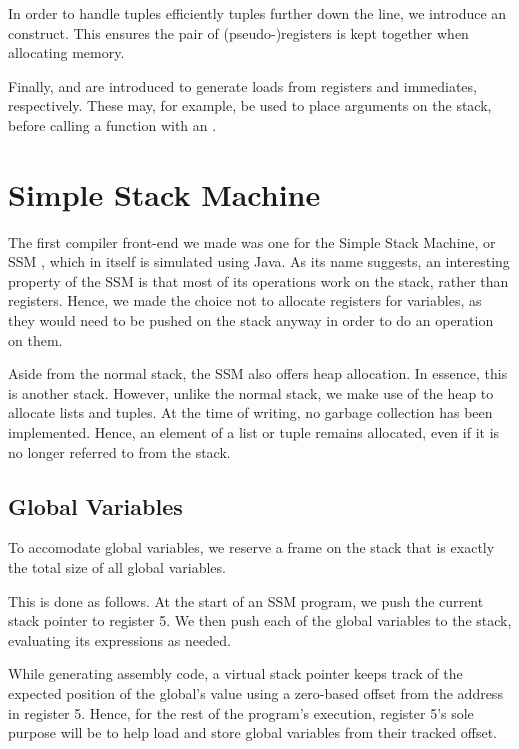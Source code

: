 In order to handle tuples efficiently tuples further down the line, we introduce an  construct.
This ensures the pair of (pseudo-)registers is kept together when allocating memory.

Finally,  and  are introduced to generate loads from registers and immediates, respectively.
These may, for example, be used to place arguments on the stack, before calling a function with an .


\section{Simple Stack Machine}

The first compiler front-end we made was one for the Simple Stack Machine, or SSM \cite{SSM}, which in itself is simulated using Java.
As its name suggests, an interesting property of the SSM is that most of its operations work on the stack, rather than registers.
Hence, we made the choice not to allocate registers for variables, as they would need to be pushed on the stack anyway in order to do an operation on them.

Aside from the normal stack, the SSM also offers heap allocation.
In essence, this is another stack.
However, unlike the normal stack, we make use of the heap to allocate lists and tuples.
At the time of writing, no garbage collection has been implemented.
Hence, an element of a list or tuple remains allocated, even if it is no longer referred to from the stack.


\subsection{Global Variables}

To accomodate global variables, we reserve a frame on the stack that is exactly the total size of all global variables.

This is done as follows.
At the start of an SSM program, we push the current stack pointer to register 5.
We then push each of the global variables to the stack, evaluating its expressions as needed.

While generating assembly code, a virtual stack pointer keeps track of the expected position of the global's value using a zero-based offset from the address in register 5.
Hence, for the rest of the program's execution, register 5's sole purpose will be to help load and store global variables from their tracked offset.


